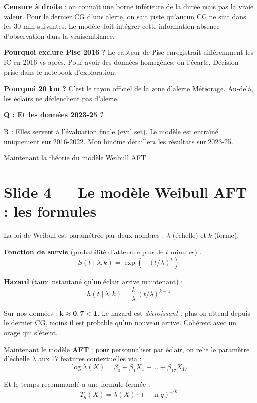 \documentclass[11pt,a4paper]{article}
\begin{document}
\begin{compr}
\textbf{Censure à droite} : on connaît une borne inférieure de la durée mais pas la vraie
valeur. Pour le dernier CG d'une alerte, on sait juste qu'aucun CG ne suit dans les 30 min
suivantes. Le modèle doit intégrer cette information \og absence d'observation \fg{} dans la
vraisemblance.

\textbf{Pourquoi exclure Pise 2016 ?} Le capteur de Pise enregistrait différemment les IC
en 2016 vs après. Pour avoir des données homogènes, on l'écarte. Décision prise dans
le notebook d'exploration.

\textbf{Pourquoi 20 km ?} C'est le rayon officiel de la zone d'alerte Météorage.
Au-delà, les éclairs ne déclenchent pas d'alerte.
\end{compr}

\begin{piege}
\textbf{Q : Et les données 2023-25 ?}

R : Elles servent à l'évaluation finale (eval set). Le modèle est entraîné uniquement sur
2016-2022. Mon binôme détaillera les résultats sur 2023-25.
\end{piege}

\begin{transit}
\og Maintenant la théorie du modèle Weibull AFT. \fg{}
\end{transit}

\section{Slide 4 — Le modèle Weibull AFT : les formules}

\begin{dire}
\og La loi de Weibull est paramétrée par deux nombres : $\lambda$ (échelle) et $k$ (forme).

\textbf{Fonction de survie} (probabilité d'attendre plus de $t$ minutes) :
\[
S(t \mid \lambda, k) = \exp\!\left(-(t/\lambda)^k\right)
\]

\textbf{Hazard} (taux instantané qu'un éclair arrive maintenant) :
\[
h(t \mid \lambda, k) = \frac{k}{\lambda}\,(t/\lambda)^{k-1}
\]

Sur nos données : $\mathbf{k \approx 0{,}7 < 1}$. Le hazard est \emph{décroissant} : plus
on attend depuis le dernier CG, moins il est probable qu'un nouveau arrive. Cohérent avec
un orage qui s'éteint.

Maintenant le modèle \textbf{AFT} : pour personnaliser par éclair, on relie le paramètre
d'échelle $\lambda$ aux 17 features contextuelles via :
\[
\log \lambda(X) = \beta_0 + \beta_1 X_1 + \dots + \beta_{17} X_{17}
\]

Et le temps recommandé a une formule fermée :
\[
T_q(X) = \lambda(X) \cdot (-\ln q)^{1/k}
\]
\fg{}
\end{dire}
\end{document}
